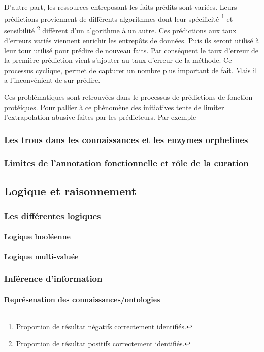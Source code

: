 \begin{refsection}
    D’autre part, les ressources entreposant les faits prédits sont variées. Leurs prédictions proviennent  de différents algorithmes dont leur spécificité \footnote{Proportion de résultat négatifs correctement identifiés.} et sensibilité \footnote{Proportion de résultat positifs correctement identifiés.} diffèrent d’un algorithme à un autre. Ces prédictions aux taux d’erreurs variés viennent enrichir les entrepôts de données. Puis ils seront utilisé à leur tour utilisé pour prédire de nouveau faits. Par conséquent  le taux d’erreur de la première prédiction vient s’ajouter au taux d’erreur de la méthode. Ce processus cyclique, permet de capturer un nombre plus important de fait. Mais il a l’inconvénient de sur-prédire.
    
    Ces problématiques sont retrouvées dans le processus de prédictions de fonction protéiques.
    Pour pallier à ce phénomène des initiatives tente de limiter l’extrapolation abusive faites par les prédicteurs. Par exemple \citeauthor{pfeiffer2015manual}
    
    
    \subsubsection{Les trous dans les connaissances et les enzymes orphelines}
    \subsubsection{Limites de l’annotation fonctionnelle et rôle de la curation}
    \subsection{Logique et raisonnement}
    \subsubsection{Les différentes logiques}
    \paragraph{Logique booléenne}
    \paragraph{Logique multi-valuée}
    \subsubsection{Inférence d’information}
    \paragraph{Représenation des connaissances/ontologies}

\end{refsection}
